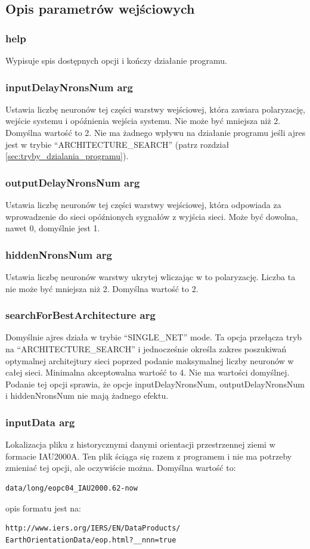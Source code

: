 \documentclass[12pt,a4]{article}
\begin{document}
\subsection{Opis parametrów wejściowych}

\subsubsection{help} Wypisuje spis dostępnych opcji i kończy działanie programu.
\subsubsection{inputDelayNronsNum arg} Ustawia liczbę neuronów tej części warstwy wejściowej, która zawiara polaryzację,
wejście systemu i opóźnienia wejścia systemu. Nie może być mniejsza niż 2. Domyślna wartość to 2. Nie ma żadnego wpływu 
na działanie programu jeśli ajres jest w trybie ``ARCHITECTURE\_SEARCH'' 
(patrz rozdział \ref{sec:tryby_dzialania_programu}).
\subsubsection{outputDelayNronsNum arg} Ustawia liczbę neuronów tej części warstwy wejściowej, która odpowiada za
wprowadzenie do sieci opóźnionych sygnałów z wyjścia sieci. Może być dowolna, nawet 0, domyślnie jest 1.
\subsubsection{hiddenNronsNum arg} Ustawia liczbę neuronów warstwy ukrytej wliczając w to polaryzację. Liczba ta nie może
być mniejsza niż 2. Domyślna wartość to 2.
\subsubsection{searchForBestArchitecture arg} Domyślnie ajres działa w trybie ``SINGLE\_NET'' mode. Ta opcja przełącza tryb
na ``ARCHITECTURE\_SEARCH'' i jednocześnie określa zakres poszukiwań optymalnej architejtury sieci poprzed podanie
maksymalnej liczby neuronów w całej sieci. Minimalna akceptowalna wartość to 4. Nie ma wartości domyślnej.
Podanie tej opcji sprawia, że opcje inputDelayNronsNum, outputDelayNronsNum i hiddenNronsNum nie mają żadnego efektu.
\subsubsection{inputData arg} Lokalizacja pliku z historycznymi danymi orientacji przestrzennej ziemi w formacie IAU2000A.
Ten plik ściąga się razem z programem i nie ma potrzeby zmieniać tej opcji, ale oczywiście można. Domyślna wartość to:\\
\begin{verbatim}data/long/eopc04_IAU2000.62-now\end{verbatim}opis formatu jest na:\\
\begin{verbatim}http://www.iers.org/IERS/EN/DataProducts/
EarthOrientationData/eop.html?__nnn=true\end{verbatim}
\end{document}
